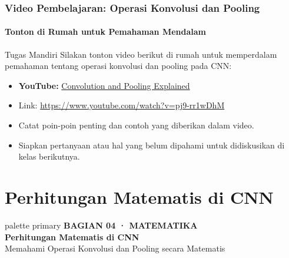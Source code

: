 \documentclass[t,aspectratio=169,xcolor=dvipsnames]{beamer}
\begin{document}
\begin{frame}
    \frametitle{Video Pembelajaran: Operasi Konvolusi dan Pooling}
    \framesubtitle{Tonton di Rumah untuk Pemahaman Mendalam}

    \begin{block}{Tugas Mandiri}
        Silakan tonton video berikut di rumah untuk memperdalam pemahaman tentang operasi konvolusi dan pooling pada CNN:
        \begin{itemize}
            \item \textbf{YouTube:} \href{https://www.youtube.com/watch?v=pj9-rr1wDhM}{Convolution and Pooling Explained}
            \item Link: \href{https://www.youtube.com/watch?v=pj9-rr1wDhM}{https://www.youtube.com/watch?v=pj9-rr1wDhM}
        \end{itemize}
    \end{block}

    \begin{itemize}
        \item Catat poin-poin penting dan contoh yang diberikan dalam video.
        \item Siapkan pertanyaan atau hal yang belum dipahami untuk didiskusikan di kelas berikutnya.
    \end{itemize}
\end{frame}

\section{Perhitungan Matematis di CNN}

\begin{frame}[plain]
  \begin{beamercolorbox}[wd=\paperwidth,ht=\paperheight,sep=1.5cm]{palette primary}
    \vspace{1.5cm}
    {\scriptsize\bfseries\color{dlMute}BAGIAN 04 · MATEMATIKA}\\[0.4cm]
    {\Huge\bfseries Perhitungan Matematis di CNN}\\[0.4cm]
    {\small\color{dlHairline}Memahami Operasi Konvolusi dan Pooling secara Matematis}
    \vfill
  \end{beamercolorbox}
\end{frame}
\end{document}
